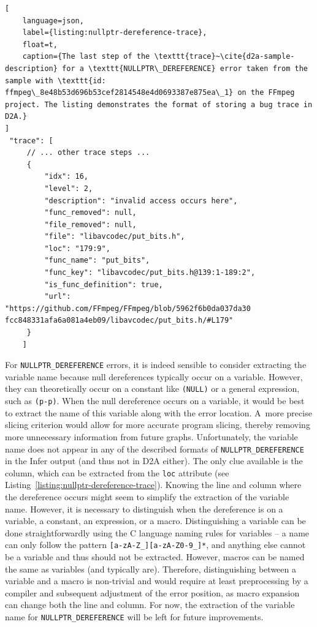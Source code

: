 \begin{lstlisting}[
    language=json, 
    label={listing:nullptr-dereference-trace}, 
    float=t,
    caption={The last step of the \texttt{trace}~\cite{d2a-sample-description} for a \texttt{NULLPTR\_DEREFERENCE} error taken from the sample with \texttt{id: ffmpeg\_8e48b53d696b53cef2814548e4d0693387e875ea\_1} on the FFmpeg project. The listing demonstrates the format of storing a bug trace in D2A.}
]
 "trace": [
     // ... other trace steps ...
     {
         "idx": 16,
         "level": 2,
         "description": "invalid access occurs here",
         "func_removed": null,
         "file_removed": null,
         "file": "libavcodec/put_bits.h",
         "loc": "179:9",
         "func_name": "put_bits",
         "func_key": "libavcodec/put_bits.h@139:1-189:2",
         "is_func_definition": true,
         "url": "https://github.com/FFmpeg/FFmpeg/blob/5962f6b0da037da30 fcc848331afa6a081a4eb09/libavcodec/put_bits.h/#L179"
     }
    ]
\end{lstlisting}

For \texttt{NULLPTR\_DEREFERENCE} errors, it is indeed sensible to consider extracting the variable name because null dereferences typically occur on a variable. However, they can theoretically occur on a constant like \texttt{(NULL)} or a general expression, such as \texttt{(p-p)}. When the null dereference occurs on a variable, it would be best to extract the name of this variable along with the error location. A~more precise slicing criterion would allow for more accurate program slicing, thereby removing more unnecessary information from future graphs. Unfortunately, the variable name does not appear in any of the described formats of \texttt{NULLPTR\_DEREFERENCE} in the Infer output (and thus not in D2A either). The only clue available is the column, which can be extracted from the \texttt{loc} attribute (see Listing~\ref{listing:nullptr-dereference-trace}). Knowing the line and column where the dereference occurs might seem to simplify the extraction of the variable name. However, it is necessary to distinguish when the dereference is on a variable, a constant, an expression, or a macro. Distinguishing a variable can be done straightforwardly using the C language naming rules for variables -- a name can only follow the pattern \texttt{[a-zA-Z\_][a-zA-Z0-9\_]*}, and anything else cannot be a variable and thus should not be extracted. However, macros can be named the same as variables (and typically are). Therefore, distinguishing between a variable and a macro is non-trivial and would require at least preprocessing by a compiler and subsequent adjustment of the error position, as macro expansion can change both the line and column. For now, the extraction of the variable name for \texttt{NULLPTR\_DEREFERENCE} will be left for future improvements.

